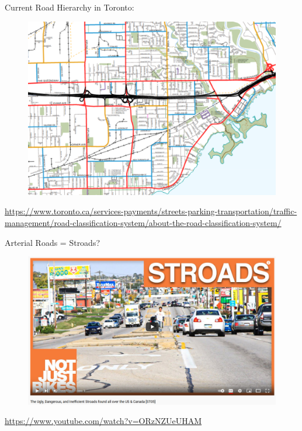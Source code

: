 \documentclass[aspectratio=169]{beamer}
\begin{document}
\begin{frame}
	
	Current Road Hierarchy in Toronto:
	
	\begin{figure}
		\centering
		\includegraphics[width=0.85\linewidth]{images/tor_road_heir.png}
		
	\end{figure}
	\tiny{\url{https://www.toronto.ca/services-payments/streets-parking-transportation/traffic-management/road-classification-system/about-the-road-classification-system/}}
	
\end{frame}




\begin{frame}
	
	Arterial Roads = Stroads?
	
	
	\begin{figure}
		\centering
		\includegraphics[width=0.85\linewidth]{images/stroads.png}
		
	\end{figure}
	\tiny{\url{https://www.youtube.com/watch?v=ORzNZUeUHAM}}
	
\end{frame}
\end{document}
